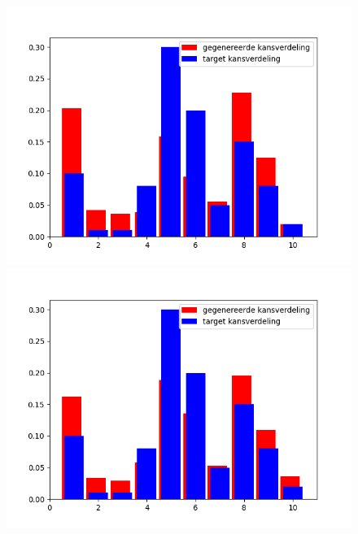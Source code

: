 \begin{figure}
\begin{minipage}{0.49\linewidth}
        \includegraphics[width=\linewidth]{Figures/goede_visualisatie_legende/visualisatie_360.png} 
    \end{minipage}
    \hfill
    \begin{minipage}{0.49\linewidth}
        \includegraphics[width=\linewidth]{Figures/goede_visualisatie_legende/visualisatie_450.png}
    \end{minipage}
    \begin{minipage}{0.49\linewidth}

\end{minipage}
\end{figure}
